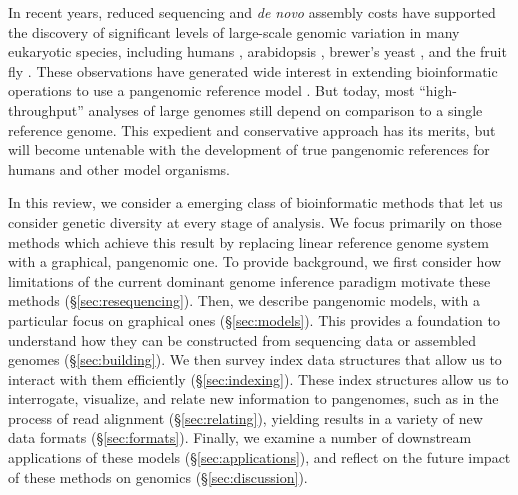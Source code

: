 
In recent years, reduced sequencing and \emph{de novo} assembly costs have supported the discovery of significant levels of large-scale genomic variation in many eukaryotic species, including humans \cite{sudmant2015integrated,Hehir-Kwa2016-hb,chaisson2018multi,Audano_2019}, arabidopsis \cite{alonso2016arabidopsis}, brewer's yeast \cite{yue2017contrasting}, and the fruit fly \cite{chakraborty2018hidden}. %
These observations have generated wide interest in extending bioinformatic operations to use a pangenomic reference model \cite{computational2016computational}.
But today, most ``high-throughput'' analyses of large genomes still depend on comparison to a single reference genome.
This expedient and conservative approach has its merits, but will become untenable with the development of true pangenomic references for humans \cite{Church2015-vt} and other model organisms.

In this review, we consider a emerging class of bioinformatic methods that let us consider genetic diversity at every stage of analysis.
We focus primarily on those methods which achieve this result by replacing linear reference genome system with a graphical, pangenomic one.
To provide background, we first consider how limitations of the current dominant genome inference paradigm motivate these methods (\S \ref{sec:resequencing}).
Then, we describe pangenomic models, with a particular focus on graphical ones (\S \ref{sec:models}).
This provides a foundation to understand how they can be constructed from sequencing data or assembled genomes (\S \ref{sec:building}).
We then survey index data structures that allow us to interact with them efficiently (\S \ref{sec:indexing}).
These index structures allow us to interrogate, visualize, and relate new information to pangenomes, such as in the process of read alignment (\S \ref{sec:relating}), yielding results in a variety of new data formats (\S \ref{sec:formats}).
Finally, we examine a number of downstream applications of these models (\S \ref{sec:applications}), and reflect on the future impact of these methods on genomics (\S \ref{sec:discussion}).

